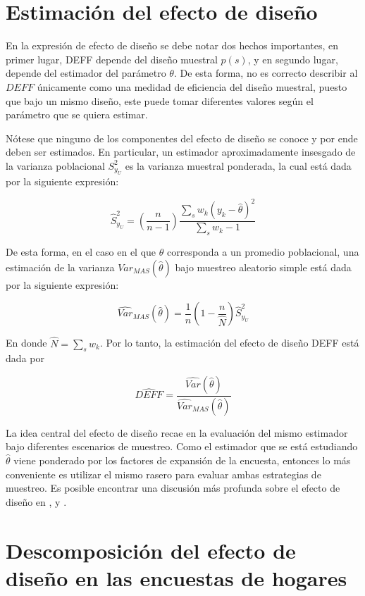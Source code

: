 \documentclass[
  12pt,
  spanish,
]{book}
\begin{document}
\hypertarget{estimaciuxf3n-del-efecto-de-diseuxf1o}{%
\section{Estimación del efecto de diseño}\label{estimaciuxf3n-del-efecto-de-diseuxf1o}}

En la expresión de efecto de diseño se debe notar dos hechos importantes, en primer lugar, DEFF depende del diseño muestral \(p(s)\), y en segundo lugar, depende del estimador del parámetro \(\theta\). De esta forma, no es correcto describir al \(DEFF\) únicamente como una medidad de eficiencia del diseño muestral, puesto que bajo un mismo diseño, este puede tomar diferentes valores según el parámetro que se quiera estimar.

Nótese que ninguno de los componentes del efecto de diseño se conoce y por ende deben ser estimados. En particular, un estimador aproximadamente insesgado de la varianza poblacional \(S^2_{y_U}\) es la varianza muestral ponderada, la cual está dada por la siguiente expresión:

\[
\hat{S}^2_{y_U} = \left(\frac{n}{n-1}\right)
\frac{\sum_s{ w_k ( y_k - \hat{\theta})^2}}{\sum_s{w_k} -1 }
\]

De esta forma, en el caso en el que \(\theta\) corresponda a un promedio poblacional, una estimación de la varianza \({Var}_{MAS}(\hat{\theta})\) bajo muestreo aleatorio simple está dada por la siguiente expresión:

\[
\widehat{Var}_{MAS}(\hat{\theta}) = \frac{1}{n} \left(1-\frac{n}{\hat N}\right)  \hat{S}^2_{y_U}
\]

En donde \(\hat N = \sum_s w_k\). Por lo tanto, la estimación del efecto de diseño DEFF está dada por

\[
\widehat{DEFF} = \frac{\widehat{Var}(\hat\theta)}{\widehat{Var}_{MAS}(\hat{\theta})}
\]

La idea central del efecto de diseño recae en la evaluación del mismo estimador bajo diferentes escenarios de muestreo. Como el estimador que se está estudiando \(\hat \theta\) viene ponderado por los factores de expansión de la encuesta, entonces lo más conveniente es utilizar el mismo rasero para evaluar ambas estrategias de muestreo. Es posible encontrar una discusión más profunda sobre el efecto de diseño en \citet[sección 4.]{Gambino_2009}, \citet[página 188]{Sarndal_Swensson_Wretman_2003} y \citet[página 101]{Gutierrez_Zhang_Montano_2016}.

\hypertarget{descomposiciuxf3n-del-efecto-de-diseuxf1o-en-las-encuestas-de-hogares}{%
\section{Descomposición del efecto de diseño en las encuestas de hogares}\label{descomposiciuxf3n-del-efecto-de-diseuxf1o-en-las-encuestas-de-hogares}}
\end{document}
